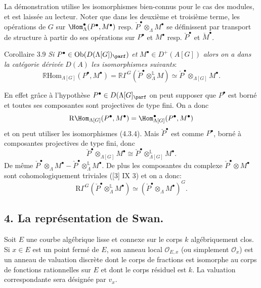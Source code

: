La démonstration utilise les isomorphismes bien-connus pour le cas des modules, et est laissée au lecteur. Noter que dans les deuxième et troisième terme, les opérations de $G$ sur $\Hom_\Lambda^\bullet(P^\bullet,M^\bullet)$ resp. $\check P^\bullet\otimes_\Lambda M^\bullet$ se définissent par transport de structure à partir do ses opérations sur $P^\bullet$ et $M^\bullet$ resp. $\check P^\bullet$ et $\check M^\bullet$.

\begin{statement}{Corollaire 3.9}
\emph{Si} $P^\bullet\in \operatorname{Ob}(D(\Lambda[G])_{\parf})$ \emph{et} $M^\bullet\in D^+(A[G])$ \emph{alors on a dans la catégorie dérivée} $D(A)$ \emph{les isomorphismes suivants}:
\[
\mathbb{R}\mathrm{Hom}_{\Lambda[G]}(P^\bullet,M^\bullet)
=\mathbb{R}\Gamma^G(\check P^\bullet\otimes_\Lambda^{\mathbb{L}}M)
\simeq \check P^\bullet\otimes_{\Lambda[G]}M^\bullet.
\tag{3.9.1}
\]
\end{statement}

En effet grâce à l'hypothèse $P^\bullet\in D(\Lambda[G]_{\parf}$ on peut supposer que $P^\bullet$ est borné et toutes ses composantes sont projectives de type 
fini. On a donc
\[
\mathrm{R}\Hom_{\Lambda[G]}(P^\bullet,M^\bullet)=\Hom_{\Lambda[G]}^\bullet(P^\bullet,M^\bullet)
\]
et on
peut utiliser les isomorphismes (4.3.4). Mais $\check P^\bullet$ est comme $P^\bullet$, borné à composantes projectives de type fini, donc
\[
\check P^\bullet\otimes_{\Lambda[G]}M^\bullet\cong \check P^\bullet\otimes_{\Lambda[G]}^{\mathbb{L}}M^\bullet.
\]
De même $\check P^\bullet\otimes_\Lambda M^\bullet-\check P^\bullet\otimes_\Lambda^{\mathbb{L}}M^\bullet$. De plus les composantes du complexe $\check P^\bullet\otimes M^\bullet$ sont cohomologiquement triviales ([3] IX 3) et on a donc:
\[
\mathrm{R}\Gamma^G(\check P^\bullet\otimes_\Lambda^{\mathbb{L}}M^\bullet)\simeq (\check P^\bullet\otimes_\Lambda M^\bullet)^G.
\]

\subsection*{4. La représentation de Swan.}

Soit $E$ une courbe algébrique lisse et connexe sur le corps $k$ algébriquement clos. Si $x\in E$ est un point fermé de $E$, son anneau local $\mathcal{O}_{E,x}$ (ou simplement $\mathcal{O}_x$) est un anneau de valuation discrète dont le corps de fractions est isomorphe au corps de fonctions rationnelles sur $E$ et dont le corps résiduel est $k$. La valuation correspondante sera désignée par $v_x$.

